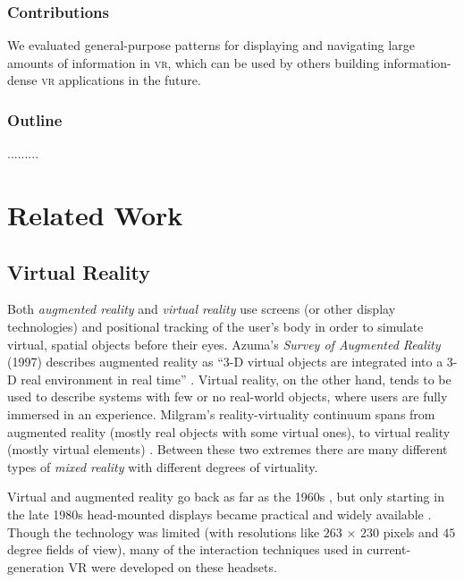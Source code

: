 \documentclass{tufte-book} %
\begin{document}
\subsection{Contributions}
We evaluated general-purpose patterns for displaying and navigating large amounts of information in \textsc{vr}, which can be used by others building information-dense \textsc{vr} applications in the future.

\subsection{Outline}

.........



\chapter{Related Work}
\label{ch:related-work}

\section{Virtual Reality}
Both \emph{augmented reality} and \emph{virtual reality} use screens (or other display technologies) and positional tracking of the user's body in order to simulate virtual, spatial objects before their eyes. Azuma's \emph{Survey of Augmented Reality} (1997) describes augmented reality as ``3-D virtual objects are integrated into a 3-D real environment in real time'' \cite{azuma1997survey}. Virtual reality, on the other hand, tends to be used to describe systems with few or no real-world objects, where users are fully immersed in an experience.
Milgram's reality-virtuality continuum spans from augmented reality (mostly real objects with some virtual ones), to virtual reality (mostly virtual elements) \cite{milgram1994taxonomy}. Between these two extremes there are many different types of \emph{mixed reality} with different degrees of virtuality.

Virtual and augmented reality go back as far as the 1960s \cite{sutherland1968head}, but only starting in the late 1980s head-mounted displays became practical and widely available \cite{billinghurst2015survey}. Though the technology was limited (with resolutions like $263$ $\times$ $230$ pixels and $45$ degree fields of view), many of the interaction techniques used in current-generation VR were developed on these headsets.
\end{document}
